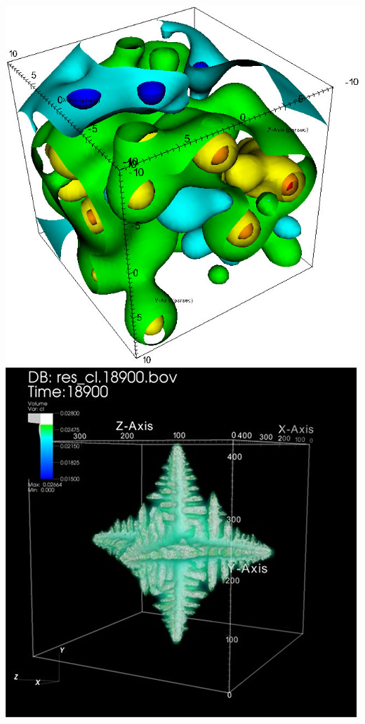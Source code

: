 \begin{frame}
\begin{columns}
\begin{column}{5cm}
        \href{https://wci.llnl.gov/simulation/computer-codes/visit/gallery}{\includegraphics[width=.475\columnwidth]{figs/visit-exs/VisIt-contour1_S}}
        \href{https://wci.llnl.gov/simulation/computer-codes/visit/gallery}{\includegraphics[width=.475\columnwidth]{figs/visit-exs/VisIt-gallery_39}}
\end{column}
\end{columns}
\end{frame}



